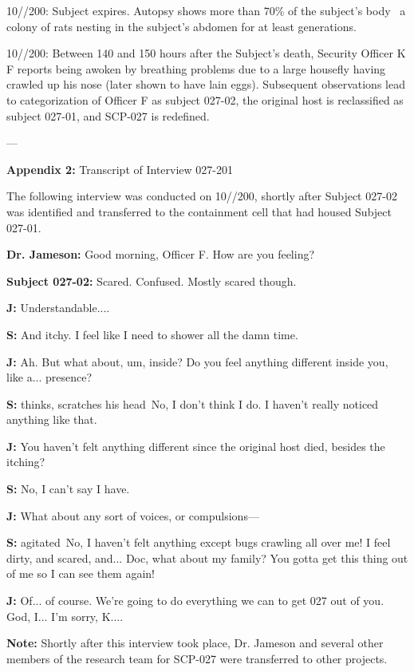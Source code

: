 10//200: Subject expires. Autopsy shows more than 70\% of the subject’s body \expunged \ a colony of rats nesting in the subject’s abdomen for at least  generations.

10//200: Between 140 and 150 hours after the Subject’s death, Security Officer K F reports being awoken by breathing problems due to a large housefly having crawled up his nose (later shown to have lain eggs). Subsequent observations lead to categorization of Officer F as subject 027-02, the original host is reclassified as subject 027-01, and SCP-027 is redefined.

\expunged

---

\textbf{Appendix 2:} Transcript of Interview 027-201

The following interview was conducted on 10//200, shortly after Subject 027-02 was identified and transferred to the containment cell that had housed Subject 027-01.
\begin{leftbar}
\textbf{Dr. Jameson:} Good morning, Officer F. How are you feeling?

\textbf{Subject 027-02:} Scared. Confused. Mostly scared though.

\textbf{J:} Understandable....

\textbf{S:} And itchy. I feel like I need to shower all the damn time.

\textbf{J:} Ah. But what about, um, inside? Do you feel anything different inside you, like a... presence?

\textbf{S:} \lb thinks, scratches his head\rb \ No, I don't think I do. I haven't really noticed anything like that.

\textbf{J:} You haven't felt anything different since the original host died, besides the itching?

\textbf{S:} No, I can't say I have.

\textbf{J:} What about any sort of voices, or compulsions—

\textbf{S:} \lb agitated\rb \ No, I haven't felt anything except bugs crawling all over me! I feel dirty, and scared, and... Doc, what about my family? You gotta get this thing out of me so I can see them again!

\textbf{J:} Of... of course. We're going to do everything we can to get 027 out of you. God, I... I'm sorry, K....
\end{leftbar}

\textbf{Note:} Shortly after this interview took place, Dr. Jameson and several other members of the research team for SCP-027 were transferred to other projects.